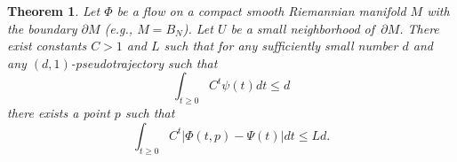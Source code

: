 \documentclass[11pt]{article}
\newcounter{razdel}[section]
\theoremstyle{Mystyle}
\newtheorem{Theorem}[razdel]{Theorem}
\begin{document}
\begin{Theorem}
\label{Th4}
Let $\Phi$ be a flow on a compact smooth Riemannian manifold $M$ with the boundary $\partial M$ (e.g., $M=B_{N}$).
Let $U$ be a small neighborhood of~$\partial M$.
There exist constants $C>1$ and $L$ such that for any sufficiently small number $d$ and any $(d,1)$-pseudotrajectory such that
\begin{equation}
\label{dpst1}
\int_{t\geq0} C^t\psi(t)dt\leq d
\end{equation}
there exists a point $p$ such that
\begin{equation}
\label{epst1}
\int_{t\geq0} C^t|\Phi(t,p) - \Psi(t)|dt\leq Ld.
\end{equation}
\end{Theorem}
\end{document}
